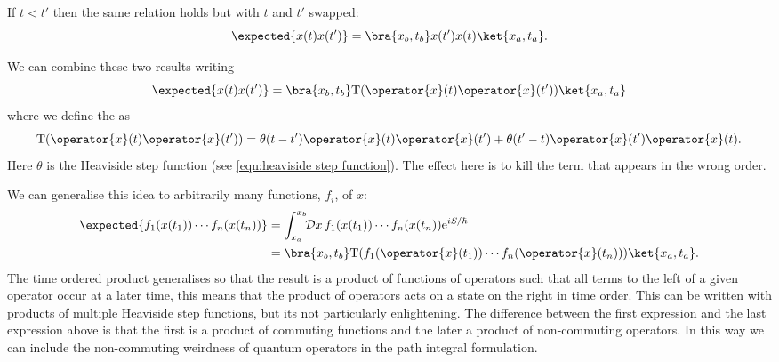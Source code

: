 \documentclass[fleqn]{NotesClass}
\newcommand*{\e}{\mathrm{e}}
\newcommand*{\timeorder}{\mathrm{T}}
\begin{document}
    If \(t < t'\) then the same relation holds but with \(t\) and \(t'\) swapped:
    \begin{equation}
        \expected{x(t)x(t')} = \bra{x_b, t_b} x(t') x(t) \ket{x_a, t_a}.
    \end{equation}
    
    We can combine these two results writing
    \begin{equation}
        \expected{x(t)x(t')} = \bra{x_b, t_b} \timeorder (\operator{x}(t)\operator{x}(t')) \ket{x_a, t_a}
    \end{equation}
    where we define the  as
    \begin{equation}
        \timeorder (\operator{x}(t)\operator{x}(t')) = \theta(t - t')\operator{x}(t)\operator{x}(t') + \theta(t' - t)\operator{x}(t')\operator{x}(t).
    \end{equation}
    Here \(\theta\) is the Heaviside step function (see \cref{eqn:heaviside step function}).
    The effect here is to kill the term that appears in the wrong order.
    
    We can generalise this idea to arbitrarily many functions, \(f_i\), of \(x\):
    \begin{align}
        \expected{f_1(x(t_1)) \dotsm f_n(x(t_n))} &= \int_{x_a}^{x_b} \!\! \DL{x} \, f_1(x(t_1)) \dotsm f_n(x(t_n)) \e^{iS/\hbar}\\
        \hspace{4cm}&= \bra{x_b, t_b} \timeorder (f_1(\operator{x}(t_1)) \dotsm f_n(\operator{x}(t_n)))\ket{x_a, t_a}.
    \end{align}
    The time ordered product generalises so that the result is a product of functions of operators such that all terms to the left of a given operator occur at a later time, this means that the product of operators acts on a state on the right in time order.
    This can be written with products of multiple Heaviside step functions, but its not particularly enlightening.
    The difference between the first expression and the last expression above is that the first is a product of commuting functions and the later a product of non-commuting operators.
    In this way we can include the non-commuting weirdness of quantum operators in the path integral formulation.
    
\end{document}

